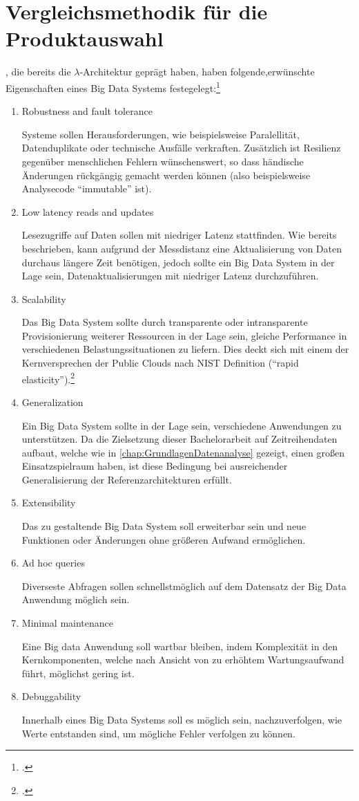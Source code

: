 \section{Vergleichsmethodik für die Produktauswahl}\label{chap:vergleichsmethodik}

\citeauthor{Marz.2015}, die bereits die $\lambda$-Architektur geprägt haben, haben folgende,erwünschte Eigenschaften eines Big Data Systems festegelegt:\footcite[Vgl.][7\psqq]{Marz.2015}
\begin{enumerate}
\item Robustness and fault tolerance

Systeme sollen Herausforderungen, wie beispielsweise Paralellität, Datenduplikate oder technische Ausfälle verkraften. Zusätzlich ist Resilienz gegenüber menschlichen Fehlern wünschenswert, so dass händische Änderungen rückgängig gemacht werden können (also beispielsweise Analysecode \enquote{immutable} ist).
\item Low latency reads and updates

Lesezugriffe auf Daten sollen mit niedriger Latenz stattfinden. Wie bereits beschrieben, kann aufgrund der Messdistanz eine Aktualisierung von Daten durchaus längere Zeit benötigen, jedoch sollte ein Big Data System in der Lage sein, Datenaktualisierungen mit niedriger Latenz durchzuführen.
\item Scalability

Das Big Data System sollte durch transparente oder intransparente Provisionierung weiterer Ressourcen in der Lage sein, gleiche Performance in verschiedenen Belastungssituationen zu liefern. Dies deckt sich mit einem der Kernversprechen der Public Clouds nach NIST Definition (\enquote{rapid elasticity}).\footcite[Vgl.][2]{Mell.2011}
\item Generalization

Ein Big Data System sollte in der Lage sein, verschiedene Anwendungen zu unterstützen. Da die Zielsetzung dieser Bachelorarbeit auf Zeitreihendaten aufbaut, welche wie in \autoref{chap:GrundlagenDatenanalyse} gezeigt, einen großen Einsatzspielraum haben, ist diese Bedingung bei ausreichender Generalisierung der Referenzarchitekturen erfüllt.
\item Extensibility

Das zu gestaltende Big Data System soll erweiterbar sein und neue Funktionen oder Änderungen ohne größeren Aufwand ermöglichen.
\item Ad hoc queries

Diverseste Abfragen sollen schnellstmöglich auf dem Datensatz der Big Data Anwendung möglich sein.
\item Minimal maintenance

Eine Big data Anwendung soll wartbar bleiben, indem Komplexität in den Kernkomponenten, welche nach Ansicht von \citeauthor{Marz.2015} zu erhöhtem Wartungsaufwand führt, möglichst gering ist.
\item Debuggability

Innerhalb eines Big Data Systems soll es möglich sein, nachzuverfolgen, wie Werte entstanden sind, um mögliche Fehler verfolgen zu können.
\end{enumerate}

